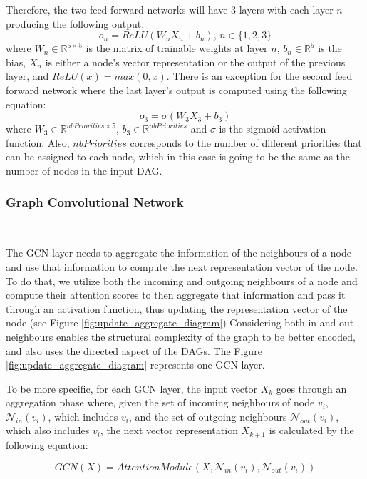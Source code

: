 Therefore, the two feed forward networks will have 3 layers with each 
layer $n$ producing the following output,
\begin{equation}
    o_{n} = ReLU(W_{n}X_{n} + b_n),\, n \in \{1,2,3\}
\end{equation}
where $W_n \in \mathbb{R}^{5\times5}$ is the matrix of trainable weights
at layer $n$, $b_n \in \mathbb{R}^5$ is the bias, $X_n$ is either a node's vector representation
or the output of the previous layer, and $ReLU(x) = max(0, x)$.
There is an exception for the second feed forward network where the last 
layer's output is computed using the following equation:
\begin{equation}
    o_{3} = \sigma(W_{3}X_{3} + b_3)
\end{equation}
where $W_3 \in \mathbb{R}^{nbPriorities \times 5}$,
$b_3 \in \mathbb{R}^{nbPriorities}$ and $\sigma$ is the 
sigmoïd activation function.
Also, $nbPriorities$ corresponds to the number of different priorities
that can be assigned to each node, which in this case is going to be the same as the number of nodes in the input DAG.


\subsubsection{Graph Convolutional Network}
~

The GCN layer needs to aggregate the information 
of the neighbours of a node and use that information
to compute the next representation vector of the node.
To do that, we utilize both the incoming and outgoing neighbours
of a node and compute their attention scores to then aggregate
that information and pass it through an activation 
function, thus updating the representation vector of the node (see Figure \ref{fig:update_aggregate_diagram})
Considering both in and out neighbours enables the structural complexity 
of the graph to be better encoded, and also
uses the directed aspect of the DAGs.
The Figure \ref{fig:update_aggregate_diagram} represents
one GCN layer.

To be more specific, for each GCN layer, the input vector $X_k$ 
goes through an aggregation phase where,
given the set of incoming neighbours of node $v_i$, $\mathcal{N}_{in}(v_i)$, which includes
$v_i$, and the set of outgoing neighbours $\mathcal{N}_{out}(v_i)$, which also includes $v_i$,
the next vector representation $X_{k+1}$ is calculated by the following equation:

\begin{equation}
GCN(X) = AttentionModule(X, \mathcal{N}_{in}(v_i), \mathcal{N}_{out}(v_i))
\end{equation}

